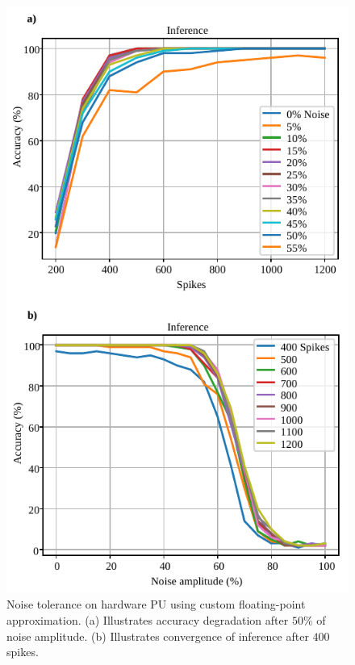\begin{figure}[h!]
	\centering
	\includegraphics[width=1\columnwidth]{../figures/accuracy_vs_noise_pu_cfp(4-bit-exponent_1-bit-mantissa).pdf}
	\caption{Noise tolerance on hardware PU using custom floating-point approximation. (a) Illustrates accuracy degradation after $50\%$ of noise amplitude. (b) Illustrates convergence of inference after $400$ spikes.}
	\label{fig:accuracy_vs_noise_pu_cfp}
\end{figure}

